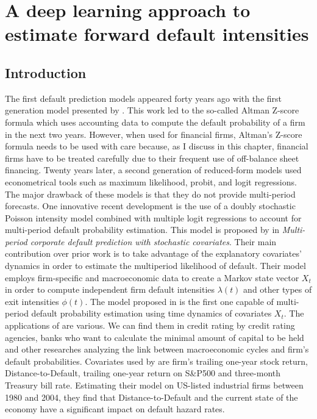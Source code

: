 \chapter{A deep learning approach to estimate forward default intensities}

\section{Introduction}
\label{S:1.1}
The first default prediction models appeared forty years ago with the first generation model presented by \citet{altman}. This work led to the so-called Altman Z-score formula which uses accounting data to compute the default probability of a firm in the next two years. However, when used for financial firms, Altman's Z-score formula needs to be used with care  because, as I discuss in this chapter, financial firms have to be treated carefully due to their frequent use of off-balance sheet financing. Twenty years later, a second generation of reduced-form models used econometrical tools such as maximum likelihood, probit, and logit regressions. The major drawback of these models is that they do not provide multi-period forecasts. One innovative recent development is the use of a doubly stochastic Poisson intensity model combined with multiple logit regressions to account for multi-period default probability estimation. This model is proposed by \citet{DSW} in \textit{Multi-period corporate default prediction with stochastic covariates}. Their main contribution over prior work is to take advantage of the explanatory covariates' dynamics in order to estimate the multiperiod likelihood of default. Their model employs firm-specific and macroeconomic data to create a Markov state vector $X_t$ in order to compute independent firm default intensities $\lambda(t)$ and other types of exit intensities $\phi(t)$.
The model proposed in \citet{DSW} is the first one capable of multi-period default probability estimation using time dynamics of covariates $X_t$. The applications of \citet{DSW} are various. We can find them in credit rating by credit rating agencies, banks who want to calculate the minimal amount of capital to be held and other researches analyzing the link between macroeconomic cycles and firm's default probabilities. Covariates used by \citet{DSW} are firm's trailing one-year stock return, Distance-to-Default, trailing one-year return on S\&P500 and three-month Treasury bill rate. Estimating their model on US-listed industrial firms between 1980 and 2004, they find that Distance-to-Default and the current state of the economy have a significant impact on default hazard rates.

